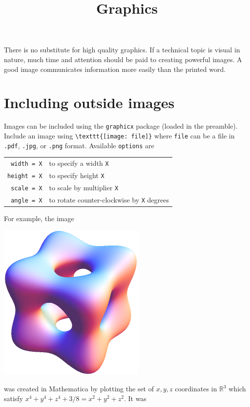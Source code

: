 \documentclass{article}
\title{Graphics}
\date{}
\begin{document}
\maketitle

There is no substitute for high quality graphics.  If a technical topic is
visual in nature, much time and attention should be paid to creating powerful
images.  A good image communicates information more easily than the printed
word.

\section{Including outside images}

Images can be included using the \verb~graphicx~ package (loaded in the
preamble).  Include an image using \verb~\texttt{[image: file]}~ where
\verb~file~ can be a file in \verb~.pdf~, \verb~.jpg~, or \verb~.png~ format.
Available \verb~options~ are
\begin{center}
  \begin{tabular}{r l}
    \verb~width = X~  & to specify a width \verb~X~     \\
    \verb~height = X~ & to specify height \verb~X~      \\
    \verb~scale = X~  & to scale by multiplier \verb~X~ \\
    \verb~angle = X~  & to rotate counter-clockwise by \verb~X~ degrees
  \end{tabular}
\end{center}
For example, the image
\begin{center}
  \includegraphics[scale = 1.25]{351Week6HolyCube}
\end{center}
was created in Mathematica by plotting the set of $x,y,z$ coordinates in
$\mathbb{R}^3$ which satisfy \(x^4+y^4+z^4 + 3/8 = x^2+y^2+z^2 \).  It was
\end{document}
